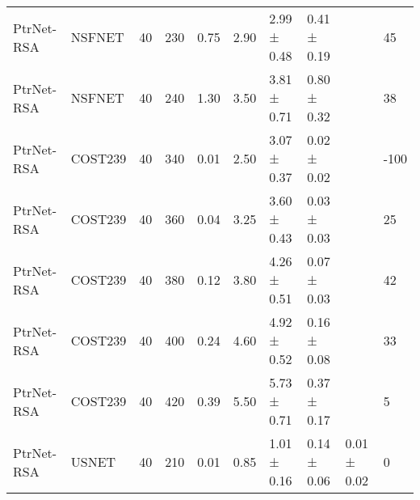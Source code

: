 \begin{longtable}[!htbp]{llll|lllll|l}
PtrNet-RSA           & NSFNET            & 40                   & 230                                                               & 0.75 & \multicolumn{1}{l|}{2.90}     & 2.99 ± 0.48 & 0.41 ± 0.19      &                   & 45                                                                                    \\
PtrNet-RSA           & NSFNET            & 40                   & 240                                                               & 1.30  & \multicolumn{1}{l|}{3.50}     & 3.81 ± 0.71 & 0.80 ± 0.32       &                   & 38                                                                                    \\
PtrNet-RSA           & COST239           & 40                   & 340                                                               & 0.01 & \multicolumn{1}{l|}{2.50}     & 3.07 ± 0.37 & 0.02 ± 0.02      &                   & -100                                                                                    \\
PtrNet-RSA           & COST239           & 40                   & 360                                                               & 0.04 & \multicolumn{1}{l|}{3.25}    & 3.60 ± 0.43  & 0.03 ± 0.03      &                   & 25                                                                                      \\
PtrNet-RSA           & COST239           & 40                   & 380                                                               & 0.12 & \multicolumn{1}{l|}{3.80}     & 4.26 ± 0.51 & 0.07 ± 0.03      &                   & 42                                                                                    \\
PtrNet-RSA           & COST239           & 40                   & 400                                                               & 0.24 & \multicolumn{1}{l|}{4.60}     & 4.92 ± 0.52 & 0.16 ± 0.08      &                   & 33                                                                                    \\
PtrNet-RSA           & COST239           & 40                   & 420                                                               & 0.39 & \multicolumn{1}{l|}{5.50}     & 5.73 ± 0.71 & 0.37 ± 0.17      &                   & 5                                                                                   \\
PtrNet-RSA           & USNET             & 40                   & 210                                                               & 0.01 & \multicolumn{1}{l|}{0.85}    & 1.01 ± 0.16 & 0.14 ± 0.06      & 0.01 ± 0.02       & 0                                                                                       \\

\end{longtable}

